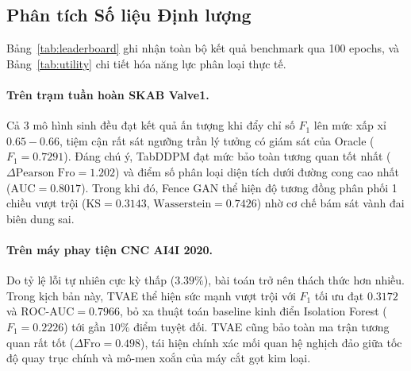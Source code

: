 \documentclass{article}
\begin{document}
\subsection{Phân tích Số liệu Định lượng}
Bảng~\ref{tab:leaderboard} ghi nhận toàn bộ kết quả benchmark qua 100 epochs, và Bảng~\ref{tab:utility} chi tiết hóa năng lực phân loại thực tế.

\paragraph{Trên trạm tuần hoàn SKAB Valve1.} Cả 3 mô hình sinh đều đạt kết quả ấn tượng khi đẩy chỉ số $F_1$ lên mức xấp xỉ $0.65 - 0.66$, tiệm cận rất sát ngưỡng trần lý tưởng có giám sát của Oracle ($F_1 = 0.7291$). Đáng chú ý, TabDDPM đạt mức bảo toàn tương quan tốt nhất ($\Delta \text{Pearson Fro} = 1.202$) và điểm số phân loại diện tích dưới đường cong cao nhất ($\text{AUC} = 0.8017$). Trong khi đó, Fence GAN thể hiện độ tương đồng phân phối 1 chiều vượt trội ($\text{KS} = 0.3143$, $\text{Wasserstein} = 0.7426$) nhờ cơ chế bám sát vành đai biên dung sai.

\paragraph{Trên máy phay tiện CNC AI4I 2020.} Do tỷ lệ lỗi tự nhiên cực kỳ thấp ($3.39\%$), bài toán trở nên thách thức hơn nhiều. Trong kịch bản này, TVAE thể hiện sức mạnh vượt trội với $F_1$ tối ưu đạt $0.3172$ và $\text{ROC-AUC} = 0.7966$, bỏ xa thuật toán baseline kinh điển Isolation Forest ($F_1 = 0.2226$) tới gần $10\%$ điểm tuyệt đối. TVAE cũng bảo toàn ma trận tương quan rất tốt ($\Delta \text{Fro} = 0.498$), tái hiện chính xác mối quan hệ nghịch đảo giữa tốc độ quay trục chính và mô-men xoắn của máy cắt gọt kim loại.
\end{document}

